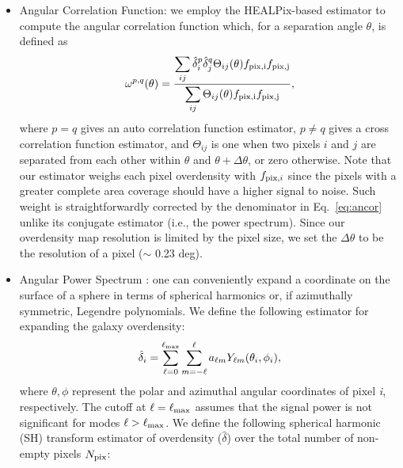 \begin{itemize}
    \item Angular Correlation Function: we employ the HEALPix-based estimator to compute the angular correlation function which, for a separation angle $\theta$, is defined as \citep[see e.g.][]{scranton2002analysis,ross2011ameliorating}
    \begin{align}
        \omega^{p,q} (\theta) = \frac{\displaystyle\sum_{ij} \hat{\delta}^{p}_{i} \hat{\delta}^{q}_{j} \Theta_{ij}(\theta) f_{\rm pix, i}f_{\rm pix, j}}{\displaystyle\sum_{ij} \Theta_{ij}(\theta) f_{\rm pix, i}f_{\rm pix, j}},\label{eq:ancor}
    \end{align}
    where $p=q$ gives an auto correlation function estimator, $p\neq q$ gives a cross correlation function estimator, and $\Theta_{ij}$ is one when two pixels $i$ and $j$ are separated from each other within $\theta$ and $\theta+\Delta\theta$, or zero otherwise. Note that our estimator weighs each pixel overdensity with $f_{{\rm pix}, i}$ since the pixels with a greater complete area coverage should have a higher signal to noise. Such weight is straightforwardly corrected by the denominator in Eq.~\ref{eq:ancor} unlike its conjugate estimator (i.e., the power spectrum). Since our overdensity map resolution is limited by the pixel size, we set the $\Delta\theta$ to be the resolution of a pixel ($\sim$ 0.23 deg). \\


    \item Angular Power Spectrum : one can conveniently expand a coordinate on the surface of a sphere in terms of spherical harmonics or, if azimuthally symmetric, Legendre polynomials. We define the following estimator for expanding the galaxy overdensity:
    \begin{equation}
        \hat{\delta}_{i} = \sum_{\ell=0}^{\ell_{{\rm max}}}\sum_{m=-\ell}^{\ell} a_{\ell m} Y_{\ell m}(\theta_{i}, \phi_{i}),
    \end{equation}
    where $\theta, \phi$ represent the polar and azimuthal angular coordinates of pixel \textit{i}, respectively. The cutoff at $\ell=\ell_{{\rm max}}$ assumes that the signal power is not significant for modes $\ell>\ell_{{\rm max}}$. We define the following spherical harmonic (SH) transform estimator of overdensity ($\hat{\delta}$) over the total number of non-empty pixels $N_{{\rm pix}}$:
   

\end{itemize}
